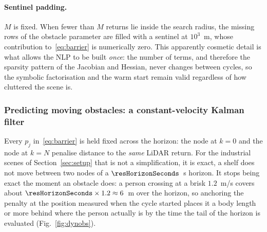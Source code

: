 \documentclass[11pt,a4paper]{article}
\begin{document}
\paragraph{Sentinel padding.} $M$ is fixed. When fewer than $M$ returns lie inside the search radius, the
missing rows of the obstacle parameter are filled with a sentinel at $10^3$~m, whose contribution
to~\eqref{eq:barrier} is numerically zero. This apparently cosmetic detail is what allows the NLP to be built
\emph{once}: the number of terms, and therefore the sparsity pattern of the Jacobian and Hessian, never
changes between cycles, so the symbolic factorisation and the warm start remain valid regardless of how
cluttered the scene is.

\subsubsection{Predicting moving obstacles: a constant-velocity Kalman filter}
\label{sec:obspredict}

Every $p_j$ in~\eqref{eq:barrier} is held fixed across the horizon: the node at $k=0$ and the node at $k=N$
penalise distance to the \emph{same} LiDAR return. For the industrial scenes of Section~\ref{sec:setup} that
is not a simplification, it is exact, a shelf does not move between two nodes of a
$\resHorizonSeconds$~s horizon. It stops being exact the moment an obstacle does: a person crossing at a
brisk $1.2$~m/s covers about $\resHorizonSeconds\times1.2\approx6$~m over the horizon, so anchoring the
penalty at the position measured when the cycle started places it a body length or more behind where the
person actually is by the time the tail of the horizon is evaluated (Fig.~\ref{fig:dynobs}).
\end{document}
